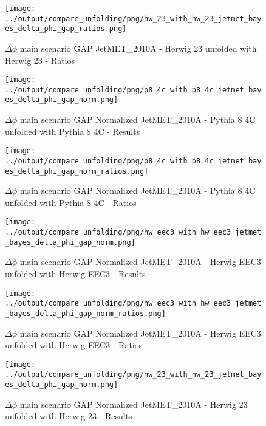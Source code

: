 \documentclass[11pt]{book}
\begin{document}
\begin{figure}[ht]
\centering
\texttt{[image: ../output/compare\_unfolding/png/hw\_23\_with\_hw\_23\_jetmet\_bayes\_delta\_phi\_gap\_ratios.png]}
\caption{$\Delta\phi$ main scenario GAP JetMET\_2010A - Herwig 23 unfolded with Herwig 23 - Ratios}
\label{hw_23_hw_23_jetmet_bayes_delta_phi_gap_b}
\end{figure}


\begin{figure}[ht]
\centering
\texttt{[image: ../output/compare\_unfolding/png/p8\_4c\_with\_p8\_4c\_jetmet\_bayes\_delta\_phi\_gap\_norm.png]}
\caption{$\Delta\phi$ main scenario GAP Normalized JetMET\_2010A - Pythia 8 4C unfolded with Pythia 8 4C - Results}
\label{p8_p8_jetmet_bayes_delta_phi_gap_norm_a}
\end{figure}

\begin{figure}[ht]
\centering
\texttt{[image: ../output/compare\_unfolding/png/p8\_4c\_with\_p8\_4c\_jetmet\_bayes\_delta\_phi\_gap\_norm\_ratios.png]}
\caption{$\Delta\phi$ main scenario GAP Normalized JetMET\_2010A - Pythia 8 4C unfolded with Pythia 8 4C - Ratios}
\label{p8_p8_jetmet_bayes_delta_phi_gap_norm_b}
\end{figure}

\begin{figure}[ht]
\centering
\texttt{[image: ../output/compare\_unfolding/png/hw\_eec3\_with\_hw\_eec3\_jetmet\_bayes\_delta\_phi\_gap\_norm.png]}
\caption{$\Delta\phi$ main scenario GAP Normalized JetMET\_2010A - Herwig EEC3 unfolded with Herwig EEC3 - Results}
\label{hw_eec3_hw_eec3_jetmet_bayes_delta_phi_gap_norm_a}
\end{figure}

\begin{figure}[ht]
\centering
\texttt{[image: ../output/compare\_unfolding/png/hw\_eec3\_with\_hw\_eec3\_jetmet\_bayes\_delta\_phi\_gap\_norm\_ratios.png]}
\caption{$\Delta\phi$ main scenario GAP Normalized JetMET\_2010A - Herwig EEC3 unfolded with Herwig EEC3 - Ratios}
\label{hw_eec3_hw_eec3_jetmet_bayes_delta_phi_gap_norm_b}
\end{figure}

\begin{figure}[ht]
\centering
\texttt{[image: ../output/compare\_unfolding/png/hw\_23\_with\_hw\_23\_jetmet\_bayes\_delta\_phi\_gap\_norm.png]}
\caption{$\Delta\phi$ main scenario GAP Normalized JetMET\_2010A - Herwig 23 unfolded with Herwig 23 - Results}
\label{hw_23_hw_23_jetmet_bayes_delta_phi_gap_norm_a}
\end{figure}
\end{document}
